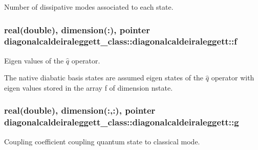 Number of dissipative modes associated to each state. 

\hypertarget{structdiagonalcaldeiraleggett__class_1_1diagonalcaldeiraleggett_a6c6fdff53cbf8de731e09cd56ed90657}{
\subsubsection[{f}]{\setlength{\rightskip}{0pt plus 5cm}real(double), dimension(\+:), pointer diagonalcaldeiraleggett\+\_\+class\+::diagonalcaldeiraleggett\+::f\hspace{0.3cm}{\ttfamily [private]}}}\label{structdiagonalcaldeiraleggett__class_1_1diagonalcaldeiraleggett_a6c6fdff53cbf8de731e09cd56ed90657}


Eigen values of the $ \hat q $ operator. 

The native diabatic basis states are assumed eigen states of the $ \hat q $ operator with eigen values stored in the array f of dimension nstate. \hypertarget{structdiagonalcaldeiraleggett__class_1_1diagonalcaldeiraleggett_aa1f4900dfeb9c70fd6eb3220bed703a5}{
\subsubsection[{g}]{\setlength{\rightskip}{0pt plus 5cm}real(double), dimension(\+:,\+:), pointer diagonalcaldeiraleggett\+\_\+class\+::diagonalcaldeiraleggett\+::g\hspace{0.3cm}{\ttfamily [private]}}}\label{structdiagonalcaldeiraleggett__class_1_1diagonalcaldeiraleggett_aa1f4900dfeb9c70fd6eb3220bed703a5}


Coupling coefficient coupling quantum state to classical mode. 

